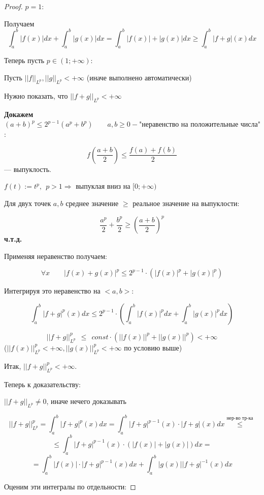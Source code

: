 \begin{proof}

    $p = 1$:

    Получаем
    \[
     \int^b_a |f(x)| dx + \int^b_a | g(x) | dx = \int_{a}^{b} |f(x)| + |g(x)| dx \ge \int^b_a |f + g| (x) dx 
    \]
    

    Теперь пусть $p \in (1; +\infty)$:

    Пусть $||f||_{L^p}, ||g||_{L^p} < +\infty$ (иначе выполнено автоматически)

    Нужно показать, что $||f+g||_{L^p} < +\infty$

    \textbf{Докажем} $(a + b)^p \le 2^{p-1}(a^p+b^p) \qquad a, b \ge 0 - \text{"неравенство на положительные числа"}$:

    \[
    f\left(\frac{a+b}{2}\right) \le \frac{f(a) + f(b)}{2}
    \]
    --- выпуклость.

    $f(t) := t^p, \ \ p > 1 \Rightarrow$ выпуклая вниз на $[0; +\infty)$

    Для двух точек $a, b$ среднее значение $\ge$ реальное значение на выпуклости:

    \[ \frac{a^p}{2} + \frac{b^p}{2} \ge \left( \frac{a + b}{2} \right)^p \]
    \textbf{ч.т.д.}

    Применяя неравенство получаем:

    \[ \forall x \qquad |f(x) + g(x) | ^p \le 2^{p-1}\cdot(|f(x)|^p+|g(x)|^p) \]

    Интегрируя это неравенство на $<a, b>$:

    \[ \int^b_a |f+g|^p(x) dx \le 2^{p-1} \cdot \left(\int_a^b|f(x)|^p dx + \int_a^b |g(x)|^p dx\right) \]

    \[ ||f+g||^p_{L^p} \ \ \le \ \ const \cdot (||f(x)||^p + ||g(x)||^p) < +\infty \]
    ($||f(x)||^p_{L^p} < +\infty, ||g(x)||^p_{L^p} < +\infty$ по условию выше)

    Итак, $||f+g||^p_{L^p} < +\infty$.

    Теперь к доказательству:

    $||f + g||_{L^p} \not = 0$, иначе нечего доказывать

    \[
    ||f+g||^p_{L^p} = \int^b_a |f+g|^p(x) dx = \int^b_a |f+g|^{p-1}(x) \cdot |f+g|(x) dx \overset{\text{нер-во тр-ка}}{\le}  
    \]
    \[
    \le \int^b_a |f+g|^{p-1}(x)\cdot (|f(x)|+|g(x)|) dx = 
    \]
    \[
    = \int^b_a|f(x)|\cdot |f+g|^{p-1}(x) dx + \int^b_a |g(x)||f + g|^{-1}(x) dx
    \]

    Оценим эти интегралы по отдельности:


\end{proof}
